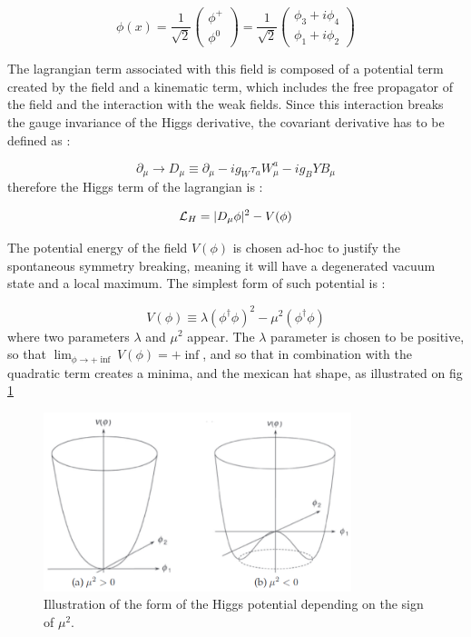 \begin{equation}
    \phi(x) = \frac{1}{\sqrt{2}} \begin{pmatrix} \phi^+ \\ \phi^0 \end{pmatrix} = \frac{1}{\sqrt{2}} \begin{pmatrix} \phi_3 + i \phi_4 \\ \phi_1 + i \phi_2 \end{pmatrix}
\end{equation}

The lagrangian term associated with this field is composed of a potential term created by the field and a kinematic term, which includes the free propagator of the field and the interaction with the weak fields. Since this interaction breaks the gauge invariance of the Higgs derivative, the covariant derivative has to be defined as :

\begin{equation}
    \partial_{\mu} \rightarrow D_{\mu} \equiv \partial_{\mu} -ig_W \tau_a W_{\mu}^a - ig_B Y B_{\mu}
\end{equation}
therefore the Higgs term of the lagrangian is :

\begin{equation}
    \mathcal{L}_H = | D_{\mu}\phi |^2 - V(\phi)
    \label{eq:higgs_lagr}
\end{equation}

The potential energy of the field $V(\phi)$ is chosen ad-hoc to justify the spontaneous symmetry breaking, meaning it will have a degenerated vacuum state and a local maximum. The simplest form of such potential is :

\begin{equation}
    V(\phi) \equiv \lambda(\phi^{\dagger}\phi)^2 - \mu^2 (\phi^{\dagger}\phi)
\end{equation}
where two parameters $\lambda$ and $\mu^2$ appear. The $\lambda$ parameter is chosen to be positive, so that $\lim_{\phi \to + \inf} V(\phi) = + \inf$, and so that in combination with the quadratic term creates a minima, and the mexican hat shape, as illustrated on fig \ref{fig:mexicanhat}

\begin{figure}
    \centering
    \includegraphics[width=0.8\textwidth]{Images/higgs_potential.png}
    \caption{Illustration of the form of the Higgs potential depending on the sign of $\mu^2$.}
    \label{fig:mexicanhat}
\end{figure}

